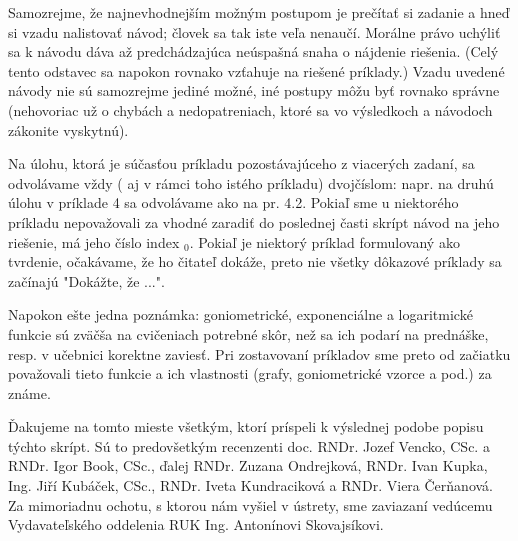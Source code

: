 Samozrejme, že najnevhodnejším možným postupom je prečítať si zadanie a hneď si
vzadu nalistovať návod; človek sa tak iste veľa nenaučí. Morálne právo uchýliť
sa k návodu dáva až predchádzajúca neúspašná snaha o nájdenie riešenia. (Celý
tento odstavec sa napokon rovnako vzťahuje na riešené príklady.) Vzadu uvedené
návody nie sú samozrejme jediné možné, iné postupy môžu byť rovnako správne
(nehovoriac už o chybách a nedopatreniach, ktoré sa vo výsledkoch a návodoch
zákonite vyskytnú).

Na úlohu, ktorá je súčasťou príkladu pozostávajúceho z viacerých zadaní, sa
odvolávame vždy ( aj v rámci toho istého príkladu) dvojčíslom: napr. na druhú
úlohu v príklade 4 sa odvolávame ako na pr. 4.2. Pokiaľ sme u niektorého
príkladu nepovažovali za vhodné zaradiť do poslednej časti skrípt návod na jeho
riešenie, má jeho číslo index $_0$. Pokiaľ je niektorý príklad formulovaný ako
tvrdenie, očakávame, že ho čitateľ dokáže, preto nie všetky dôkazové príklady
sa začínajú "Dokážte, že ...".

Napokon ešte jedna poznámka: goniometrické, exponenciálne a logaritmické
funkcie sú zväčša na cvičeniach potrebné skôr, než sa ich podarí na prednáške,
resp. v učebnici korektne zaviesť. Pri zostavovaní príkladov sme preto od
začiatku považovali tieto funkcie a ich vlastnosti (grafy, goniometrické vzorce
a pod.) za známe.

Ďakujeme na tomto mieste všetkým, ktorí príspeli k výslednej podobe popisu
týchto skrípt. Sú to predovšetkým recenzenti doc. RNDr. Jozef Vencko, CSc. a
RNDr. Igor Book, CSc., ďalej RNDr. Zuzana Ondrejková, RNDr. Ivan Kupka, Ing.
Jiří Kubáček, CSc., RNDr. Iveta Kundraciková a RNDr. Viera Čerňanová. Za
mimoriadnu ochotu, s ktorou nám vyšiel v ústrety, sme zaviazaní vedúcemu
Vydavateľského oddelenia RUK Ing. Antonínovi Skovajsíkovi.
